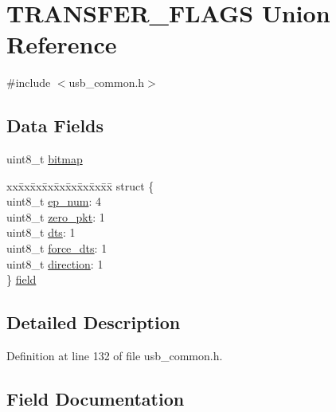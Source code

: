 \hypertarget{union_t_r_a_n_s_f_e_r___f_l_a_g_s}{}\section{T\+R\+A\+N\+S\+F\+E\+R\+\_\+\+F\+L\+A\+GS Union Reference}
\label{union_t_r_a_n_s_f_e_r___f_l_a_g_s}


{\ttfamily \#include $<$usb\+\_\+common.\+h$>$}

\subsection*{Data Fields}
\begin{DoxyCompactItemize}
\item 
uint8\+\_\+t \mbox{\hyperlink{union_t_r_a_n_s_f_e_r___f_l_a_g_s_af37eb37e6f2ba058599923f1fdb75360}{bitmap}}
\item 
\begin{tabbing}
xx\=xx\=xx\=xx\=xx\=xx\=xx\=xx\=xx\=\kill
struct \{\\
\>uint8\_t \mbox{\hyperlink{union_t_r_a_n_s_f_e_r___f_l_a_g_s_a0eb60627df64d4e20dc3a36f3c1af073}{ep\_num}}: 4\\
\>uint8\_t \mbox{\hyperlink{union_t_r_a_n_s_f_e_r___f_l_a_g_s_a3dbf03d72e11e17778bca583ab0381cf}{zero\_pkt}}: 1\\
\>uint8\_t \mbox{\hyperlink{union_t_r_a_n_s_f_e_r___f_l_a_g_s_ad0a003bce451292d1163a4d6fe533574}{dts}}: 1\\
\>uint8\_t \mbox{\hyperlink{union_t_r_a_n_s_f_e_r___f_l_a_g_s_a905113be5625941ed80e4710f60fe7ef}{force\_dts}}: 1\\
\>uint8\_t \mbox{\hyperlink{union_t_r_a_n_s_f_e_r___f_l_a_g_s_ac6116d5235e13e059e591879c46d7174}{direction}}: 1\\
\} \mbox{\hyperlink{union_t_r_a_n_s_f_e_r___f_l_a_g_s_afd81dd12d3e2fb9501ba4ea749afc1df}{field}}\\

\end{tabbing}\end{DoxyCompactItemize}


\subsection{Detailed Description}


Definition at line 132 of file usb\+\_\+common.\+h.



\subsection{Field Documentation}
\mbox{\label{union_t_r_a_n_s_f_e_r___f_l_a_g_s_af37eb37e6f2ba058599923f1fdb75360}} 
